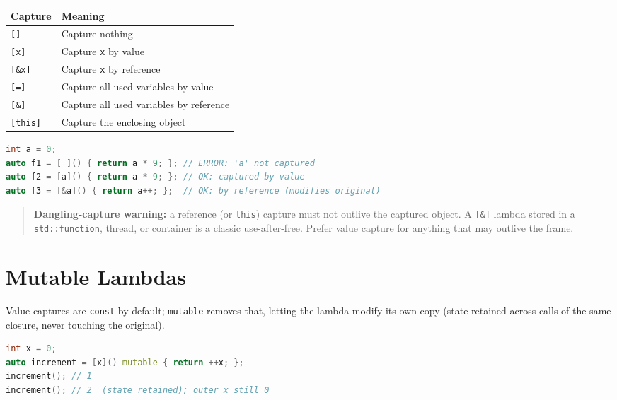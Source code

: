 \begin{center}
\begin{tabular}{|l|l|}
\hline \textbf{Capture} & \textbf{Meaning} \\ \hline
\texttt{[]}      & Capture nothing \\
\texttt{[x]}     & Capture \texttt{x} by value \\
\texttt{[\&x]}   & Capture \texttt{x} by reference \\
\texttt{[=]}     & Capture all used variables by value \\
\texttt{[\&]}    & Capture all used variables by reference \\
\texttt{[this]}  & Capture the enclosing object \\
\hline
\end{tabular}
\end{center}

\begin{lstlisting}[language=C++, caption={capture by value vs reference}]
int a = 0;
auto f1 = [ ]() { return a * 9; }; // ERROR: 'a' not captured
auto f2 = [a]() { return a * 9; }; // OK: captured by value
auto f3 = [&a]() { return a++; };  // OK: by reference (modifies original)
\end{lstlisting}

\begin{quote}
\textbf{Dangling-capture warning:} a reference (or \texttt{this}) capture must not outlive the captured object. A \texttt{[\&]} lambda stored in a \texttt{std::function}, thread, or container is a classic use-after-free. Prefer value capture for anything that may outlive the frame.
\end{quote}

\section{Mutable Lambdas}

Value captures are \texttt{const} by default; \texttt{mutable} removes that, letting the lambda modify its own copy (state retained across calls of the same closure, never touching the original).

\begin{lstlisting}[language=C++, caption={a mutable lambda holds state}]
int x = 0;
auto increment = [x]() mutable { return ++x; };
increment(); // 1
increment(); // 2  (state retained); outer x still 0
\end{lstlisting}

